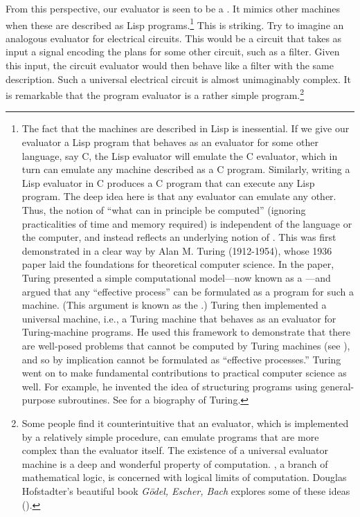 From this perspective, our evaluator is seen to be a .  It mimics other machines when these are described as Lisp
programs.\footnote{The fact that the machines are described in Lisp is
inessential.  If we give our evaluator a Lisp program that behaves as an
evaluator for some other language, say C, the Lisp evaluator will emulate the C
evaluator, which in turn can emulate any machine described as a C program.
Similarly, writing a Lisp evaluator in C produces a C program that can execute
any Lisp program.  The deep idea here is that any evaluator can emulate any
other.  Thus, the notion of ``what can in principle be computed'' (ignoring
practicalities of time and memory required) is independent of the language or
the computer, and instead reflects an underlying notion of
.  This was first demonstrated in a clear way by Alan
M. Turing (1912-1954), whose 1936 paper laid the foundations for theoretical
computer science.  In the paper, Turing presented a simple computational
model---now known as a ---and argued that any
``effective process'' can be formulated as a program for such a machine.  (This
argument is known as the .)  Turing then
implemented a universal machine, i.e., a Turing machine that behaves as an
evaluator for Turing-machine programs.  He used this framework to demonstrate
that there are well-posed problems that cannot be computed by Turing machines
(see ), and so by implication cannot be formulated as
``effective processes.''  Turing went on to make fundamental contributions to
practical computer science as well.  For example, he invented the idea of
structuring programs using general-purpose subroutines.  See  for a
biography of Turing.} This is striking. Try to imagine an analogous evaluator
for electrical circuits.  This would be a circuit that takes as input a signal
encoding the plans for some other circuit, such as a filter.  Given this input,
the circuit evaluator would then behave like a filter with the same
description.  Such a universal electrical circuit is almost unimaginably
complex.  It is remarkable that the program evaluator is a rather simple
program.\footnote{Some people find it counterintuitive that an evaluator, which
is implemented by a relatively simple procedure, can emulate programs that are
more complex than the evaluator itself.  The existence of a universal evaluator
machine is a deep and wonderful property of computation.  , a branch of mathematical logic, is concerned with logical limits of
computation.  Douglas Hofstadter's beautiful book \textit{G\"odel, Escher, Bach}
explores some of these ideas ().}

